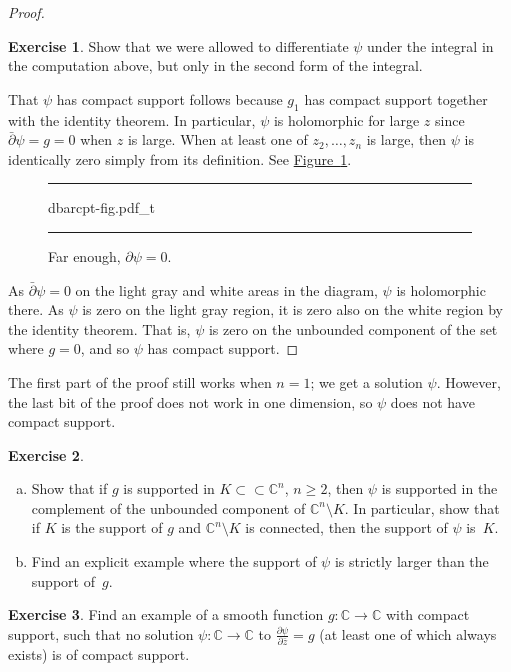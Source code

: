 \documentclass[12pt,openany]{book}
\newcommand{\C}{{\mathbb{C}}}
\theoremstyle{plain}
\theoremstyle{remark}
\theoremstyle{definition}
\newenvironment{exbox}{%
    \def\FrameCommand{\vrule width 1pt \relax\hspace{10pt}}%
    \MakeFramed{\advance\hsize-\width\FrameRestore}%
}{%
    \endMakeFramed
}
\newenvironment{exparts}{%
    \leavevmode\begin{enumerate}[a),noitemsep,topsep=0pt,parsep=0pt,partopsep=0pt]
}{%
    \end{enumerate}
}
\newenvironment{myfig}{%
\begin{figure}[h!t]
\noindent\rule{\textwidth}{0.5pt}\vspace{12pt}\par\centering}%
{\par\noindent\rule{\textwidth}{0.5pt}
\end{figure}}
\theoremstyle{exercise}
\newtheorem{exercise}{Exercise}[section]
\theoremstyle{example}
\newcommand{\figureref}[1]{\hyperref[#1]{Figure~\ref*{#1}}}
\begin{document}
\begin{proof}
\begin{exbox}
\begin{exercise}
Show that we were allowed to differentiate $\psi$
under the integral in the computation above, but only in the second form
of the integral.
\end{exercise}
\end{exbox}

That $\psi$ has compact support follows because $g_1$ has compact
support together with the identity theorem.  In particular, $\psi$ is
holomorphic for large $z$ since $\bar{\partial} \psi = g = 0$ when $z$
is large.  When at least one of $z_2,\ldots,z_n$ is large,
then $\psi$ is identically zero
simply from its definition.  See \figureref{fig:dbarcpt-fig}.

\begin{myfig}
{dbarcpt-fig.pdf_t}
\caption{Far enough, $\partial \psi = 0$.\label{fig:dbarcpt-fig}}
\end{myfig}

As $\bar{\partial} \psi = 0$ on the light gray and white areas in the
diagram, $\psi$ is holomorphic there. As $\psi$ is zero on the light
gray region, it is zero also on the white region by the identity theorem.
That is, $\psi$ is zero on the unbounded component of the set where $g=0$,
and so $\psi$ has compact support.
\end{proof}

The first part of the proof still works when $n=1$; we get a solution
$\psi$.  However, the last bit of the proof does not work in one dimension, so
$\psi$ does not have compact support.

\begin{exbox}
\begin{exercise} \label{exercise:supportofpsi}
\begin{exparts}
\item
Show that if $g$ is supported in $K \subset \subset \C^n$, $n \geq 2$,
then $\psi$ is supported in the complement of the unbounded component
of $\C^n \setminus K$.  In particular, show that if $K$ is the support of
$g$ and $\C^n \setminus K$ is connected, then the support of
$\psi$ is~$K$.
\item
Find an explicit example where the support of $\psi$ is strictly larger
than the support of~$g$.
\end{exparts}
\end{exercise}

\begin{exercise}
Find an example of a smooth function $g \colon \C \to \C$ with compact
support, such that no solution $\psi \colon \C \to \C$ to
$\frac{\partial \psi}{\partial \bar{z}} = g$ (at least one of which always exists) is
of compact support.
\end{exercise}
\end{exbox}
\end{document}
